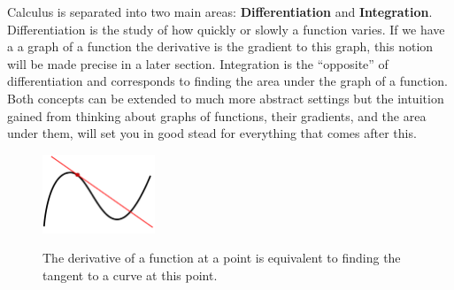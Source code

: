 Calculus is separated into two main areas: \textbf{\gls{Differentiation}} and \textbf{\gls{Integration}}. Differentiation is the study of how quickly or slowly a function varies. If we have a a graph of a function the derivative is the gradient to this graph, this notion will be made precise in a later section. Integration is the ``opposite'' of differentiation and corresponds to finding the area under the graph of a function.\\

Both concepts can be extended to much more abstract settings but the intuition gained from thinking about graphs of functions, their gradients, and the area under them, will set you in good stead for everything that comes after this.\\

\begin{figure}[ht]
    \centering
    \includegraphics[width=0.3\textwidth, alt ={A schematic of the derivative as a tangent to a curve.}]{figures/Tangent_to_a_curve}
    \caption{The derivative of a function at a point is equivalent to finding the tangent to a curve at this point.  }
\label{fig: derivative as tangent}
\end{figure}

